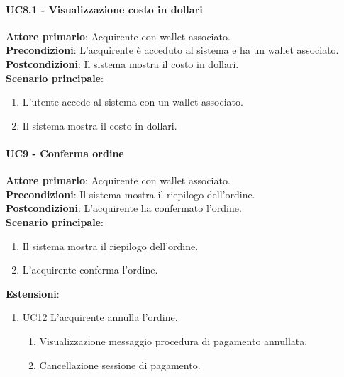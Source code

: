\documentclass[a4paper, 12pt]{article}
\begin{document}
\paragraph{UC8.1 - Visualizzazione costo in dollari}
\textbf{Attore primario}: Acquirente con wallet associato.\\
\textbf{Precondizioni}: L'acquirente è acceduto al sistema e ha un wallet associato.\\
\textbf{Postcondizioni}: Il sistema mostra il costo in dollari.\\
\textbf{Scenario principale}:
\begin{enumerate}
    \item L’utente accede al sistema con un wallet associato.
    \item Il sistema mostra il costo in dollari.
\end{enumerate}

\paragraph{UC9 - Conferma ordine}
\textbf{Attore primario}: Acquirente con wallet associato.\\
\textbf{Precondizioni}: Il sistema mostra il riepilogo dell'ordine.\\
\textbf{Postcondizioni}: L'acquirente ha confermato l'ordine.\\
\textbf{Scenario principale}:
\begin{enumerate}
    \item Il sistema mostra il riepilogo dell'ordine.
    \item L'acquirente conferma l'ordine.
\end{enumerate}
\textbf{Estensioni}:
\begin{enumerate}
    \item UC12 L'acquirente annulla l'ordine.
    \begin{enumerate}
        \item Visualizzazione messaggio procedura di pagamento annullata.
        \item Cancellazione sessione di pagamento.
    \end{enumerate}
\end{enumerate}
\end{document}
